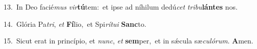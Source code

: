 {\numbfont\textcolor{\numbcolor}{13.}}~In Deo facié\textit{mus} \textit{vir}\-\textbf{tú}tem:~\star et ipse ad níhilum dedú\textit{cet} \textit{tri}\-\textit{bu}\textbf{lán}\textbf{tes} nos.\par
{\numbfont\textcolor{\numbcolor}{14.}}~Glória Pa\-\textit{tri}\-, \textit{et} \textbf{Fí}\-lio,~\star et Spi\-\textit{rí}\-\textit{tu}\textit{i} \textbf{Sanc}\-to.\par
{\numbfont\textcolor{\numbcolor}{15.}}~Sicut erat in princípio, et \textit{nunc}\-, \textit{et} \textbf{sem}\-per,~\star et in sǽcula sæ\-\textit{cu}\-\textit{ló}\textit{rum}. \textbf{A}\-men.\par
